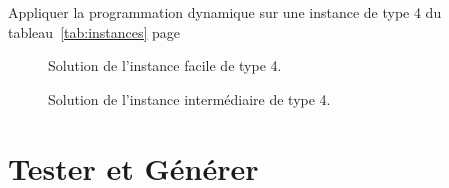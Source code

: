 \documentclass[11pt]{article}
\newcommand{\instance}[1]{instance de type #1 du tableau~\ref{tab:instances} page~\pageref{tab:instances}}
\begin{document}
  \begin{exercice}{}
    Appliquer la programmation dynamique sur une \instance{4}
  \end{exercice}

  \begin{figure}[htbp]
    \centering
    \resizebox{0.6\linewidth}{!}{
      
    }
    \caption{Solution de l'instance facile de type 4.}
  \end{figure}

  \begin{figure}[htbp]
    \centering
    \resizebox{0.6\linewidth}{!}{
      
    }
    \caption{Solution de l'instance intermédiaire de type 4.}
  \end{figure}



  \section{Tester et Générer}
\end{document}
